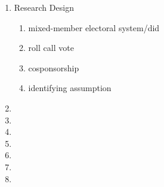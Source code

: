 \documentclass[hyphens, crop=false]{standalone}
\begin{document}
\begin{enumerate}
\begin{enumerate}
			\item
			
		\end{enumerate}
		\item
		Research Design
		\begin{enumerate}
			\item
			mixed-member electoral system/did
			\item
			roll call vote
			\item
			cosponsorship
			\item
			identifying assumption
		\end{enumerate}
		\item
		
		\item
		
		\item
		
		\item
		
		\item
		
		\item
		
		\item
		
	\end{enumerate}
	
	
	
	
	
	
	
	
	
	
\end{document}
